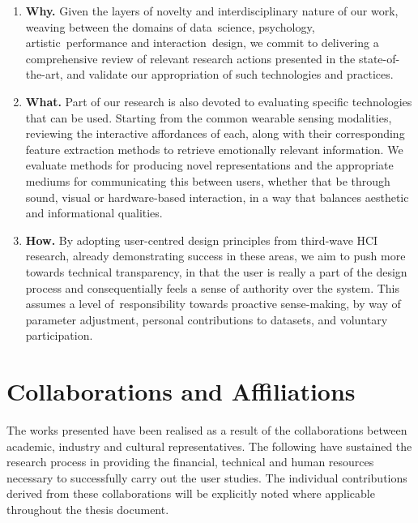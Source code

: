 
\begin{enumerate}
    \item \textbf{Why.} Given the layers of novelty and interdisciplinary nature of our work, weaving between the domains of data~science, psychology, artistic~performance and interaction~design, we commit to delivering a comprehensive review of relevant research actions presented in the state-of-the-art, and validate our appropriation of such technologies and practices.

    \item \textbf{What.} Part of our research is also devoted to evaluating specific technologies that can be used. Starting from the common wearable sensing modalities, reviewing the interactive affordances of each, along with their corresponding feature extraction methods to retrieve emotionally relevant information. We evaluate methods for producing novel representations and the appropriate mediums for communicating this between users, whether that be through sound, visual or hardware-based interaction, in a way that balances aesthetic and informational qualities.

    \item \textbf{How.} By adopting user-centred design principles from third-wave HCI research, already demonstrating success in these areas, we aim to push more towards technical transparency, in that the user is really a part of the design process and consequentially feels a sense of authority over the system. This assumes a level of~responsibility towards proactive sense-making, by way of parameter adjustment, personal contributions to datasets, and voluntary participation.
\end{enumerate}

\section{Collaborations and Affiliations}
\label{sec:collaborations}

The works presented have been realised as a result of the collaborations between academic, industry and cultural representatives. The following have sustained the research process in providing the financial, technical and human resources necessary to successfully carry out the user studies. The individual contributions derived from these collaborations will be explicitly noted where applicable throughout the thesis document.

